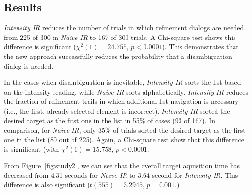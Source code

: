 






\subsection{Results}
{\em Intensity IR} reduces the number of trials in which refinement dialogs are needed from 225 of 300 in {\em Naive IR} to 167 of 300 trials. A Chi-square test shows this difference is significant ($\chi^2(1) = 24.755$, $p < 0.0001$). This demonstrates that the new approach successfully reduces the probability that a disambiguation dialog is needed.

In the cases when disambiguation is inevitable, {\em Intensity IR} sorts the list based on the intensity reading, while {\em Naive IR} sorts alphabetically. {\em Intensity IR} reduces the fraction of refinement trails in which additional list navigation is necessary (i.e., the first, already selected element is incorrect).  {\em Intensity IR} sorted the desired target as the first one in the list in 55\% of cases (93 of 167). In comparison, for {\em Naive IR}, only 35\% of trials sorted the desired target as the first one in the list (80 out of 225). Again, a Chi-square test show that this difference is significant (with $\chi^2(1) = 15.758$, $p < 0.0001$. 

From Figure~\ref{fig:study2}, we can see that the overall target aquisition time has decreased from 4.31 seconds for {\em Naive IR} to 3.64 second for {\em Intensity IR}. This difference is also significant ($t(555)=3.2945$, $p=0.001$.)  


